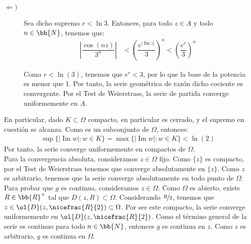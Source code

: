 \documentclass[12pt]{article}
\renewcommand{\Im}{\operatorname{Im}}
\begin{document}
\begin{ejercicio}[4 puntos]
\begin{description}
            \item[$\Longleftarrow)$] Sea dicho supremo $r<\ln 3$. Entonces, para todo $z\in A$ y todo $n\in \bb{N}$, tenemos que:
            \begin{align*}
                \left|\dfrac{\cos(nz)}{3^n}\right| &<\left(\dfrac{e^{|\Im z|}}{3}\right)^n
                < \left(\dfrac{e^{r}}{3}\right)^n
            \end{align*}

            Como $r<\ln(3)$, tenemos que $e^{r}<3$, por lo que la base de la potencia es menor que 1. Por tanto, la serie geométrica de razón dicho cociente es convergente. Por el Test de Weierstrass, la serie de partida converge uniformemente en $A$.
        \end{description}

        En particular, dado $K\subset \Omega$ compacto, en particular es cerrado, y el supremo en cuestión se alcanza. Como es un subconjunto de $\Omega$, entonces:
        \begin{align*}
            \sup\{|\Im w| : w\in K\}=\max\{|\Im w| : w\in K\} < \ln(2)
        \end{align*}
        Por tanto, la serie converge uniformemente en compactos de $\Omega$.\\

        Para la convergencia absoluta, consideramos $z\in \Omega$ fijo. Como $\{z\}$ es compacto, por el Test de Weierstrass tenemos que converge absolutamente en $\{z\}$. Como $z$ es arbitrario, tenemos que la serie converge absolutamente en todo punto de $\Omega$.\\

        Para probar que $g$ es continua, consideramos $z\in \Omega$. Como $\Omega$ es abierto, existe $R\in \bb{R}^+$ tal que $D(z,R)\subset \Omega$. Considerando $\nicefrac{R}{2}$, tenemos que $z\in \ol{D}(z,\nicefrac{R}{2})\subset \Omega$. Por ser este compacto, la serie converge uniformemente en $\ol{D}(z,\nicefrac{R}{2})$. Como el término general de la serie es continuo para todo $n\in \bb{N}$, entonces $g$ es continua en $z$. Como $z$ es arbitrario, $g$ es continua en $\Omega$.\\


\end{ejercicio}
\end{document}
